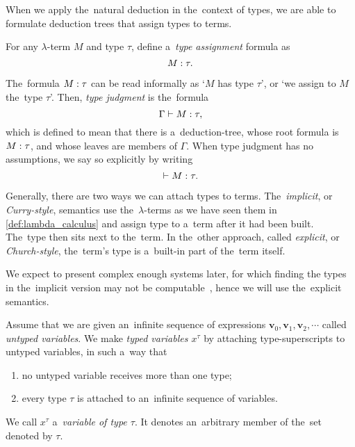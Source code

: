 
When we apply the~natural deduction in the~context of types, we are able to
formulate deduction trees that assign types to terms.

\begin{definition}
  For any $\lambda$-term $M$ and type $\tau$, define a~\emph{type assignment}
  formula as
  \[
    M \overset{}: \tau.
  \]
\end{definition}

The~formula $M \overset{}: \tau$ can be read informally as `$M$ has type $\tau$', or
`we assign to $M$ the~type $\tau$'. Then, \emph{type judgment} is the~formula
\[
  \Gamma \vdash M \overset{}: \tau,
\]
which is defined to mean that there is a~deduction-tree, whose root formula is
$M \overset{}: \tau$, and whose leaves are members of $\Gamma$. When type judgment
has no assumptions, we say so explicitly by writing
\[
  \vdash M \overset{}: \tau.
\]

\label{sec:stlc}

Generally, there are two ways we can attach types to terms. The~\emph{implicit},
or \emph{Curry-style}, semantics use the~$\lambda$-terms as we have seen them
in \autoref{def:lambda_calculus} and assign type to a~term after it had been
built. The~type then sits next to the~term. In the~other approach, called
\emph{explicit}, or \emph{Church-style}, the~term's type is a~built-in part of
the~term itself.

We expect to present complex enough systems later, for which finding the types
in the~implicit version may not be computable~\citep{wells_1999}, hence we will
use the~explicit semantics.

\begin{definition}
  Assume that we are given an~infinite sequence of expressions $\mathbf{v}_0,
  \mathbf{v}_1, \mathbf{v}_2, \cdots$ called \emph{untyped variables}. We make
  \emph{typed variables $x^\tau$} by attaching type-superscripts to untyped
  variables, in such a~way that
  \begin{enumerate}
    \item \label{def:typed_var:a_item} no untyped variable receives more than
      one type;
    \item \label{def:typed_var:b_item} every type $\tau$ is attached to
      an~infinite sequence of variables.
  \end{enumerate}
\end{definition}
We call $x^\tau$ a~\emph{variable of type $\tau$}. It denotes an~arbitrary
member of the~set denoted by $\tau$.

